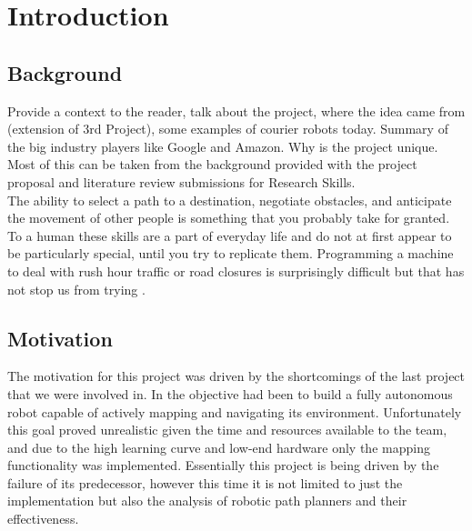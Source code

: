 \chapter{Introduction}


\section{Background}

\noindent
Provide a context to the reader, talk about the project, where the idea came from (extension of 3rd Project), some examples of courier robots today. Summary of the big industry players like Google and Amazon. Why is the project unique. Most of this can be taken from the background provided with the project proposal and literature review submissions for Research Skills.\\

\noindent
The ability to select a path to a destination, negotiate obstacles, and anticipate the movement of other people is something that you probably take for granted. To a human these skills are a part of everyday life and do not at first appear to be particularly special, until you try to replicate them. Programming a machine to deal with rush hour traffic or road closures is surprisingly difficult but that has not stop us from trying \cite{MIT}.\\

\newpage


\section{Motivation}

\noindent
The motivation for this project was driven by the shortcomings of the last project \cite{JMD14} that we were involved in. In \cite{JMD14} the objective had been to build a fully autonomous robot capable of actively mapping and navigating its environment. Unfortunately this goal proved unrealistic given the time and resources available to the team, and due to the high learning curve and low-end hardware only the mapping functionality was implemented. Essentially this project is being driven by the failure of its predecessor, however this time it is not limited to just the implementation but also the analysis of robotic path planners and their effectiveness. \\

